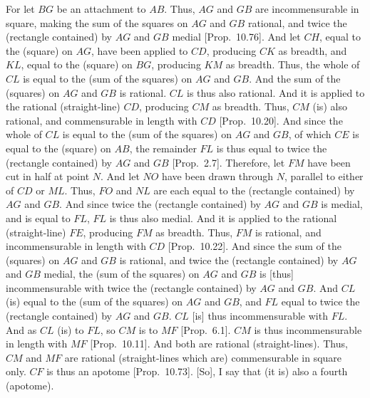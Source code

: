 For let $BG$ be an attachment to $AB$. Thus, $AG$ and $GB$ are incommensurable in square, making the sum of the squares on $AG$ and $GB$ rational, and twice the (rectangle contained) by $AG$ and $GB$ medial [Prop.~10.76]. And let $CH$,
equal to the (square) on $AG$, have been applied to $CD$, producing
$CK$ as breadth, and $KL$, equal to the (square) on $BG$, producing
$KM$ as breadth. Thus, the whole of $CL$ is equal to the (sum of the
squares) on $AG$ and $GB$. And the sum of the (squares) on $AG$ and
$GB$ is rational. $CL$ is thus also rational. And it is applied to the
rational (straight-line) $CD$, producing $CM$ as breadth. Thus, $CM$
(is) also rational, and commensurable in length with $CD$ [Prop.~10.20]. And since the whole of $CL$
is equal to the (sum of the squares) on $AG$ and $GB$, of which
$CE$ is equal to the (square) on $AB$, the remainder $FL$ is thus
equal to twice the (rectangle contained) by $AG$ and $GB$ [Prop.~2.7]. Therefore, let $FM$ have been cut in
half at point $N$. And let $NO$ have been drawn through $N$, parallel
to either of $CD$ or $ML$. Thus, $FO$ and $NL$ are each
equal to the (rectangle contained) by $AG$ and $GB$. And since
twice the (rectangle contained) by $AG$ and $GB$ is medial, and is equal
to $FL$, $FL$ is thus also medial. And it is applied to the rational (straight-line) $FE$, producing $FM$ as breadth. Thus, $FM$ is  rational, and incommensurable in length with $CD$ [Prop.~10.22]. And since the sum of the (squares)
on $AG$ and $GB$ is rational, and twice the (rectangle contained) by $AG$
and $GB$ medial, the (sum of the squares) on $AG$ and $GB$
is [thus] incommensurable with twice the (rectangle contained)
by $AG$ and $GB$. And $CL$ (is) equal to the (sum of the squares)
on $AG$ and $GB$, and $FL$ equal to twice the (rectangle contained) by $AG$ and $GB$. $CL$ [is] thus incommensurable with $FL$. And as
$CL$ (is) to $FL$, so $CM$ is to $MF$ [Prop.~6.1]. 
$CM$ is thus incommensurable in length with $MF$ [Prop.~10.11]. And both are rational (straight-lines). 
Thus, $CM$ and $MF$ are rational (straight-lines which are) commensurable
in square only. $CF$ is thus an apotome [Prop.~10.73]. [So], I say that (it is) also
a fourth (apotome).

